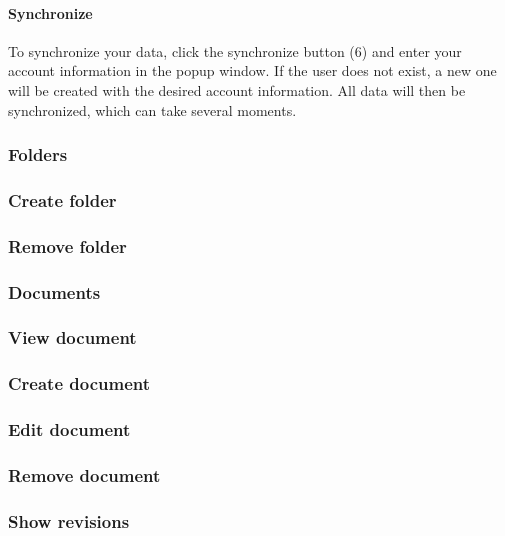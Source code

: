 \paragraph{Synchronize}
To synchronize your data, click the synchronize button (6) and enter your account information in the popup window. If the user does not exist, a new one will be created with the desired account information. All data will then be synchronized, which can take several moments.

\subsubsection{Folders}
\subsubsection{Create folder}
\subsubsection{Remove folder}

\subsubsection{Documents}
\subsubsection{View document}
\subsubsection{Create document}
\subsubsection{Edit document}
\subsubsection{Remove document}
\subsubsection{Show revisions}